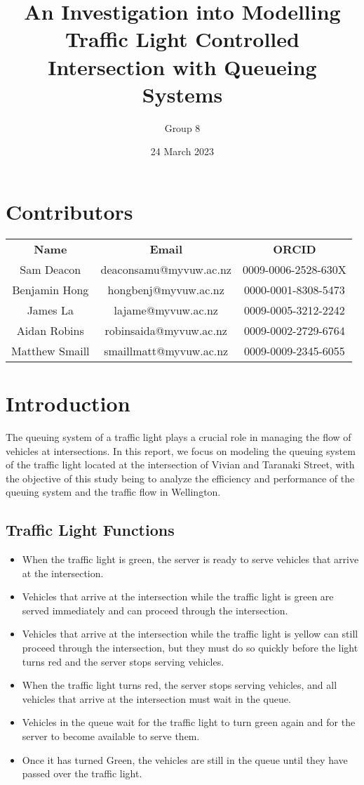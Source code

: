 \documentclass[12pt, a4paper]{article}
\title{An Investigation into Modelling Traffic Light Controlled Intersection with Queueing Systems}
\author{Group 8}
\date{24 March 2023}
\begin{document}
	
	\maketitle
	\section*{Contributors}
	\begin{center}
	\begin{tabular}{ c c c }
		\textbf{Name} & \textbf{Email} & \textbf{ORCID} \\
		Sam Deacon & deaconsamu@myvuw.ac.nz & 0009-0006-2528-630X \\
		Benjamin Hong & hongbenj@myvuw.ac.nz & 0000-0001-8308-5473 \\
		James La & lajame@myvuw.ac.nz & 0009-0005-3212-2242 \\
		Aidan Robins & robinsaida@myvuw.ac.nz & 0009-0002-2729-6764 \\
		Matthew Smaill & smaillmatt@myvuw.ac.nz & 0009-0009-2345-6055 \\
	\end{tabular}
	\end{center}
	
	\pagebreak
	
	\section{Introduction}
	The queuing system of a traffic light plays a crucial role in managing the flow of vehicles at intersections. In this report, we focus on modeling the queuing system of the traffic light located at the intersection of Vivian and Taranaki Street, with the objective of this study being to analyze the efficiency and performance of the queuing system and the traffic flow in Wellington. 
	
	\subsection{Traffic Light Functions}
	\begin{itemize}
	\item When the traffic light is green, the server is ready to serve vehicles that arrive at the intersection.
	\item Vehicles that arrive at the intersection while the traffic light is green are served immediately and can proceed through the intersection.
	\item Vehicles that arrive at the intersection while the traffic light is yellow can still proceed through the intersection, but they must do so quickly before the light turns red and the server stops serving vehicles.
	\item When the traffic light turns red, the server stops serving vehicles, and all vehicles that arrive at the intersection must wait in the queue.
	\item Vehicles in the queue wait for the traffic light to turn green again and for the server to become available to serve them.
	\item Once it has turned Green, the vehicles are still in the queue until they have passed over the traffic light. 
	\end{itemize}
	
\end{document}
